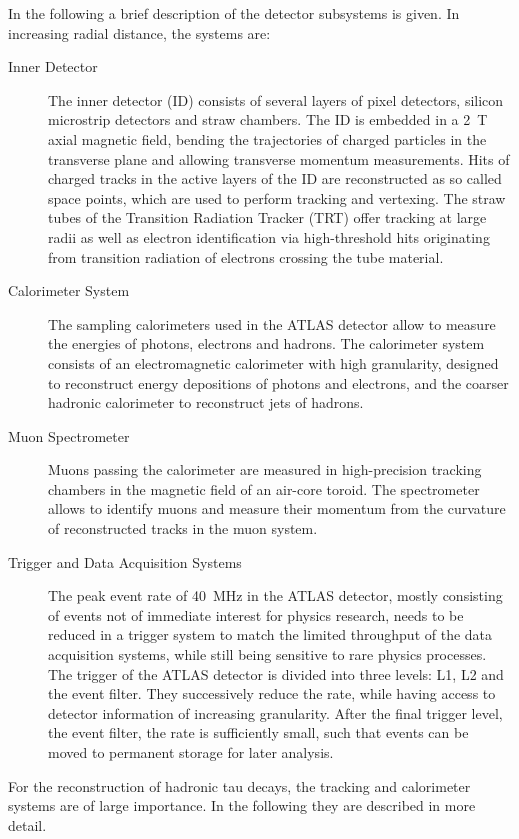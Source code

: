 In the following a brief description of the detector subsystems is given. In
increasing radial distance, the systems are:
\begin{description}
\item[Inner Detector] The inner detector (ID) consists of several layers of
  pixel detectors, silicon microstrip detectors and straw chambers. The ID is
  embedded in a \SI{2}{\tesla} axial magnetic field, bending the trajectories of
  charged particles in the transverse plane and allowing transverse momentum
  measurements. Hits of charged tracks in the active layers of the ID are
  reconstructed as so called space points, which are used to perform tracking
  and vertexing. The straw tubes of the Transition Radiation Tracker (TRT) offer
  tracking at large radii as well as electron identification via high-threshold
  hits originating from transition radiation of electrons crossing the tube
  material.

\item[Calorimeter System] The sampling calorimeters used in the ATLAS detector
  allow to measure the energies of photons, electrons and hadrons. The
  calorimeter system consists of an electromagnetic calorimeter with high
  granularity, designed to reconstruct energy depositions of photons and
  electrons, and the coarser hadronic calorimeter to reconstruct jets of
  hadrons.

\item[Muon Spectrometer] Muons passing the calorimeter are measured in
  high-precision tracking chambers in the magnetic field of an air-core toroid.
  The spectrometer allows to identify muons and measure their momentum from the
  curvature of reconstructed tracks in the muon system.

\item[Trigger and Data Acquisition Systems] The peak event rate of
  \SI{40}{\mega\hertz} in the ATLAS detector, mostly consisting of events not of
  immediate interest for physics research, needs to be reduced in a trigger
  system to match the limited throughput of the data acquisition systems, while
  still being sensitive to rare physics processes. The trigger of the ATLAS
  detector is divided into three levels: L1, L2 and the event filter. They
  successively reduce the rate, while having access to detector information of
  increasing granularity. After the final trigger level, the event filter, the
  rate is sufficiently small, such that events can be moved to permanent storage
  for later analysis.
\end{description}
For the reconstruction of hadronic tau decays, the tracking and calorimeter
systems are of large importance. In the following they are described in more
detail.


